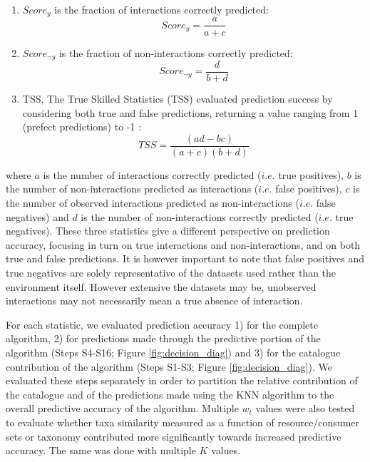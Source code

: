 \begin{enumerate}
 \item $Score_y$ is the fraction of interactions correctly predicted:
     \begin{equation}
         Score_y = \frac{a}{a + c}
     \end{equation}

 \item $Score_{\neg y}$ is the fraction of non-interactions correctly predicted:
     \begin{equation}
       Score_{\neg y}  = \frac{d}{b + d}
     \end{equation}

 \item TSS, The True Skilled Statistics (TSS) evaluated prediction success by considering both true and false predictions, returning a value ranging from 1 (prefect predictions) to -1 \citep[inverted predictions; ][]{allouche2006}:
     \begin{equation}
       TSS = \frac{(ad - bc)}{(a + c)(b + d)}
     \end{equation}
\end{enumerate}

where $a$ is the number of interactions correctly predicted ($i.e.$ true positives), $b$ is the number of non-interactions predicted as interactions ($i.e.$ false positives), $c$ is the number of observed interactions predicted as non-interactions ($i.e.$ false negatives) and $d$ is the number of non-interactions correctly predicted ($i.e.$ true negatives). These three statistics give a different perspective on prediction accuracy, focusing in turn on true interactions and non-interactions, and on both true and false predictions. It is however important to note that false positives and true negatives are solely representative of the datasets used rather than the environment itself. However extensive the datasets may be, unobserved interactions may not necessarily mean a true absence of interaction.

For each statistic, we evaluated prediction accuracy 1) for the complete algorithm, 2) for predictions made through the predictive portion of the algorithm (Steps S4-S16; Figure \ref{fig:decision_diag}) and 3) for the catalogue contribution of the algorithm (Steps S1-S3; Figure \ref{fig:decision_diag}). We evaluated these steps separately in order to partition the relative contribution of the catalogue and of the predictions made using the KNN algorithm to the overall predictive accuracy of the algorithm. Multiple $w_t$ values were also tested to evaluate whether taxa similarity measured as a function of resource/consumer sets or taxonomy contributed more significantly towards increased predictive accuracy. The same was done with multiple $K$ values.


